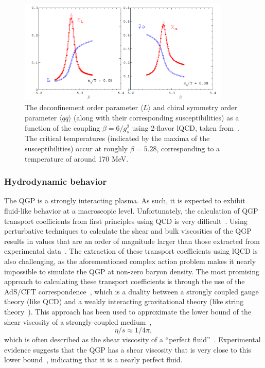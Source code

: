 \begin{figure}
    \centering
    \includegraphics[width=0.9\textwidth]{figures/introduction/phase_transition.png}
    \caption{The deconfinement order parameter $\langle L \rangle$ and chiral symmetry order parameter $\langle q\bar{q} \rangle$ (along with their corresponding susceptibilities) as a function of the coupling $\beta = 6/g_s^2$ using 2-flavor lQCD, taken from~\cite{FrithofLattice}. The critical temperatures (indicated by the maxima of the susceptibilities) occur at roughly $\beta = 5.28$, corresponding to a temperature of around 170 MeV.}
    \label{fig:order_parameters}
\end{figure}

\subsubsection{Hydrodynamic behavior}

The QGP is a strongly interacting plasma. As such, it is expected to exhibit fluid-like behavior at a macroscopic level. Unfortunately, the calculation of QGP transport coefficients from first principles using QCD is very difficult~\cite{FlowViscPaper}. Using perturbative techniques to calculate the shear and bulk viscosities of the QGP results in values that are an order of magnitude larger than those extracted from experimental data~\cite{Visc1, Visc2}. The extraction of these transport coefficients using lQCD is also challenging, as the aforementioned complex action problem makes it nearly impossible to simulate the QGP at non-zero baryon density. The most promising approach to calculating these transport coefficients is through the use of the AdS/CFT correspondence~\cite{AdSCFT}, which is a duality between a strongly coupled gauge theory (like QCD) and a weakly interacting gravitational theory (like string theory~\cite{StringTheory}). This approach has been used to approximate the lower bound of the shear viscosity of a strongly-coupled medium~\cite{QGPViscADS}, 
\begin{equation}
\eta/s \approx 1/4\pi,
\end{equation}
which is often described as the shear viscosity of a ``perfect fluid''~\cite{PerfectFluid}. Experimental evidence suggests that the QGP has a shear viscosity that is very close to this lower bound~\cite{QGPViscExp}, indicating that it is a nearly perfect fluid.


